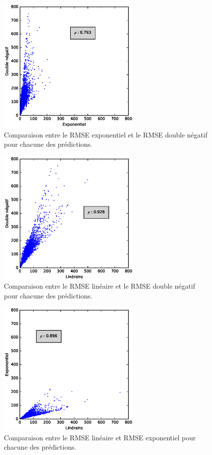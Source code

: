\documentclass[letterpaper]{article}
\begin{document}
\begin{appendices}
\begin{figure}[h]
   \centerline{\includegraphics[width=7cm]{metrics-exp-double.eps}}
   \caption{Comparaison entre le RMSE exponentiel et le RMSE double négatif pour chacune des prédictions.}
\end{figure}

\begin{figure}[h]
   \centerline{\includegraphics[width=7cm]{metrics-lin-double.eps}}
   \caption{Comparaison entre le RMSE linéaire et le RMSE double négatif pour chacune des prédictions.}
\end{figure}

\begin{figure}[h]
   \centerline{\includegraphics[width=7cm]{metrics-lin-exp.eps}}
   \caption{\label{fig:metrics-ann2}Comparaison entre le RMSE linéaire et RMSE exponentiel pour chacune des prédictions.}
\end{figure}



\end{appendices}
\end{document}
